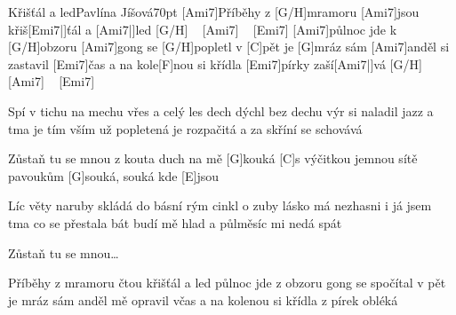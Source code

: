 \begin{song}{Křišťál a led}{Pavlína Jíšová}{70pt}
%
[Ami7]Příběhy z [G/H]mramoru [Ami7]jsou křiš[Emi7|]{ťál a} [Ami7|]{led} [G/H] ~ [Ami7] ~ [Emi7]{}
[Ami7]půlnoc jde k [G/H]obzoru [Ami7]gong se [G/H]popletl v [C]pět
je [G]mráz sám [Ami7]anděl si zastavil [Emi7]{čas}
a na kole[F]nou si křídla [Emi7]pírky zaší[Ami7|]{vá} [G/H] ~ [Ami7] ~ [Emi7]{}

%
Spí v tichu na mechu vřes a celý les
dech dýchl bez dechu výr si naladil jazz
a tma je tím vším už popletená
je rozpačitá a za skříní se schovává

\chorus%
[C]Zůstaň tu se mnou z kouta duch na mě [G]kouká
[C]s výčitkou jemnou sítě pavoukům [G]souká, souká
kde [E]jsou

%
Líc věty naruby skládá do básní
rým cinkl o zuby lásko má nezhasni
i já jsem tma co se přestala bát
budí mě hlad a půlměsíc mi nedá spát

\chorus%
Zůstaň tu se mnou\dots

%
Příběhy z mramoru čtou křišťál a led
půlnoc jde z obzoru gong se spočítal v pět
je mráz sám anděl mě opravil včas
a na kolenou si křídla z pírek obléká
\end{song}
